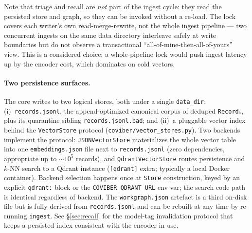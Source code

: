 Note that triage and recall are \emph{not} part of the ingest cycle: they read
the persisted store and graph, so they can be invoked without a re-load. The
lock covers each writer's own read-merge-rewrite, not the whole ingest
pipeline --- two concurrent ingests on the same data directory interleave
safely at write boundaries but do not observe a transactional
``all-of-mine-then-all-of-yours'' view. This is a considered choice: a
whole-pipeline lock would push ingest latency up by the encoder cost, which
dominates on cold vectors.

\paragraph{Two persistence surfaces.}
The core writes to two logical stores, both under a single
\texttt{data\_dir}: (i)~\texttt{records.jsonl}, the append-optimized
canonical corpus of deduped \texttt{Record}s, plus its quarantine sibling
\texttt{records.jsonl.bad}; and (ii)~a pluggable vector index behind the
\texttt{VectorStore} protocol
(\texttt{coviber/vector\_stores.py}). Two backends implement the protocol:
\texttt{JSONVectorStore} materializes the whole vector table into one
\texttt{embeddings.json} file next to \texttt{records.jsonl} (zero
dependencies, appropriate up to $\sim 10^5$ records), and
\texttt{QdrantVectorStore} routes persistence and $k$-NN search to a Qdrant
instance (\texttt{[qdrant]} extra; typically a local Docker container).
Backend selection happens once at \texttt{Store} construction, keyed by an
explicit \texttt{qdrant:} block or the \texttt{COVIBER\_QDRANT\_URL} env
var; the search code path is identical regardless of backend. The
\texttt{workgraph.json} artefact is a third on-disk file but is fully derived
from \texttt{records.jsonl} and can be rebuilt at any time by re-running
\texttt{ingest}. See \S\ref{sec:recall} for the model-tag invalidation
protocol that keeps a persisted index consistent with the encoder in use.

